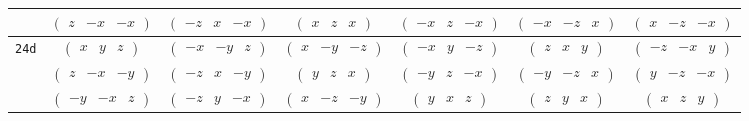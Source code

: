 \documentclass[fleqn,9pt,landscape]{jsarticle}
\begin{document}
\begin{center}
\begin{longtable}{ccccccc}
& $ \begin{pmatrix} z & - x & - x \end{pmatrix} $ & $ \begin{pmatrix} - z & x & - x \end{pmatrix} $ & $ \begin{pmatrix} x & z & x \end{pmatrix} $ & $ \begin{pmatrix} - x & z & - x \end{pmatrix} $ & $ \begin{pmatrix} - x & - z & x \end{pmatrix} $ & $ \begin{pmatrix} x & - z & - x \end{pmatrix} $ \\ \hline
{\tt 24d} & $ \begin{pmatrix} x & y & z \end{pmatrix} $ & $ \begin{pmatrix} - x & - y & z \end{pmatrix} $ & $ \begin{pmatrix} x & - y & - z \end{pmatrix} $ & $ \begin{pmatrix} - x & y & - z \end{pmatrix} $ & $ \begin{pmatrix} z & x & y \end{pmatrix} $ & $ \begin{pmatrix} - z & - x & y \end{pmatrix} $ \\
& $ \begin{pmatrix} z & - x & - y \end{pmatrix} $ & $ \begin{pmatrix} - z & x & - y \end{pmatrix} $ & $ \begin{pmatrix} y & z & x \end{pmatrix} $ & $ \begin{pmatrix} - y & z & - x \end{pmatrix} $ & $ \begin{pmatrix} - y & - z & x \end{pmatrix} $ & $ \begin{pmatrix} y & - z & - x \end{pmatrix} $ \\
& $ \begin{pmatrix} - y & - x & z \end{pmatrix} $ & $ \begin{pmatrix} - z & y & - x \end{pmatrix} $ & $ \begin{pmatrix} x & - z & - y \end{pmatrix} $ & $ \begin{pmatrix} y & x & z \end{pmatrix} $ & $ \begin{pmatrix} z & y & x \end{pmatrix} $ & $ \begin{pmatrix} x & z & y \end{pmatrix} $ \\

\end{longtable}
\end{center}
\end{document}
